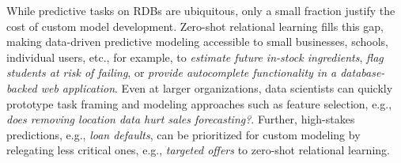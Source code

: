 While predictive tasks on RDBs are ubiquitous,
only a small fraction justify the cost of custom model development.
Zero-shot relational learning fills this gap,
making data-driven predictive modeling accessible
to small businesses, schools, individual users, etc.,
for example, to
\textit{estimate future in-stock ingredients},
\textit{flag students at risk of failing}, or
\textit{provide autocomplete functionality in a database-backed web application}.
Even at larger organizations,
data scientists can quickly prototype task framing
and modeling approaches such as feature selection,
e.g., \textit{does removing location data hurt sales forecasting?}.
Further, high-stakes predictions,
e.g., \textit{loan defaults},
can be prioritized for custom modeling
by relegating less critical ones,
e.g., \textit{targeted offers}
to zero-shot relational learning.


